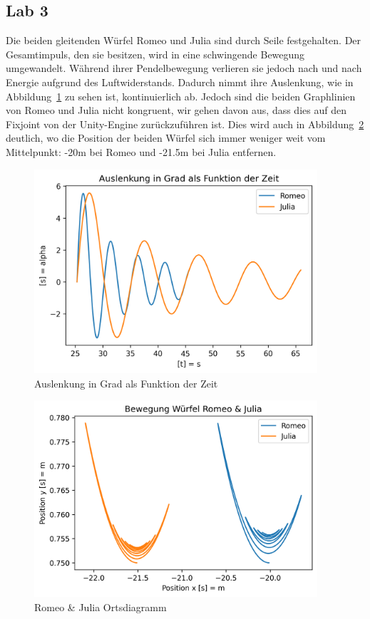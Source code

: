 \documentclass[../main.tex]{subfiles}
\begin{document}
    \subsection{Lab 3}

    Die beiden gleitenden Würfel Romeo und Julia sind durch Seile festgehalten.
    Der Gesamtimpuls, den sie besitzen, wird in eine schwingende Bewegung umgewandelt.
    Während ihrer Pendelbewegung verlieren sie jedoch nach und nach Energie aufgrund des
    Luftwiderstands. Dadurch nimmt ihre Auslenkung, wie in Abbildung~\ref{fig:Auslenkung}
    zu sehen ist, kontinuierlich ab. Jedoch sind die beiden Graphlinien von Romeo und Julia nicht kongruent,
    wir gehen davon aus, dass dies auf den Fixjoint von der Unity-Engine zurückzuführen ist.
    Dies wird auch in Abbildung~\ref{fig:RomeoJuliaOrtsdiagramm}
    deutlich, wo die Position der beiden Würfel sich immer weniger weit vom Mittelpunkt: -20m bei
    Romeo und -21.5m bei Julia entfernen.





    \begin{figure}[H]
        \begin{center}
            \centerline{\includegraphics[width=105mm]{./images/ropeJulia/AuslenkungDeg}}
            \caption{Auslenkung in Grad als Funktion der Zeit}
            \label{fig:Auslenkung}
        \end{center}
    \end{figure}

    \begin{figure}[H]
        \begin{center}
            \centerline{\includegraphics[width=105mm]{./images/ropeJulia/Ortdiagramm}}
            \caption{Romeo \& Julia Ortsdiagramm}
            \label{fig:RomeoJuliaOrtsdiagramm}
        \end{center}
    \end{figure}
\end{document}
